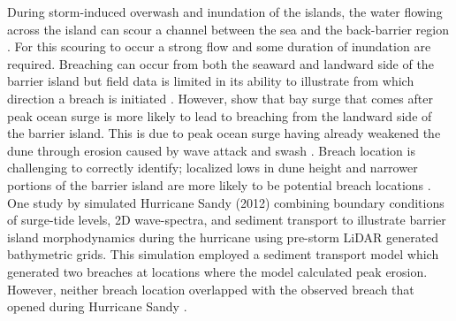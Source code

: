 \documentclass{coastal_paper}
\begin{document}
During storm-induced overwash and inundation of the islands, the water flowing across the island can scour a channel between the sea and the back-barrier region \citep{kraus2003analytical, pierce1970tidal, roelvink2009modelling}. For this scouring to occur a strong flow and some duration of inundation are required. Breaching can occur from both the seaward and landward side of the barrier island but field data is limited in its ability to illustrate from which direction a breach is initiated \citep{kraus2003analytical, pierce1970tidal, smallegan2017barrier}. However, \citet{smallegan2017barrier} show that bay surge that comes after peak ocean surge is more likely to lead to breaching from the landward side of the barrier island. This is due to peak ocean surge having already weakened the dune through erosion caused by wave attack and swash \citep{kraus2003analytical, smallegan2017barrier}. Breach location is challenging to correctly identify; localized lows in dune height and narrower portions of the barrier island are more likely to be potential breach locations \citep{kraus2003analytical, kraus2003coastal}. One study by \citet{van2019morphodynamic} simulated Hurricane Sandy (2012) combining boundary conditions of surge-tide levels, 2D wave-spectra, and sediment transport to illustrate barrier island morphodynamics during the hurricane using pre-storm LiDAR generated bathymetric grids. This simulation employed a sediment transport model which generated two breaches at locations where the model calculated peak erosion. However, neither breach location overlapped with the observed breach that opened during Hurricane Sandy \citep{van2019morphodynamic}.
\end{document}
